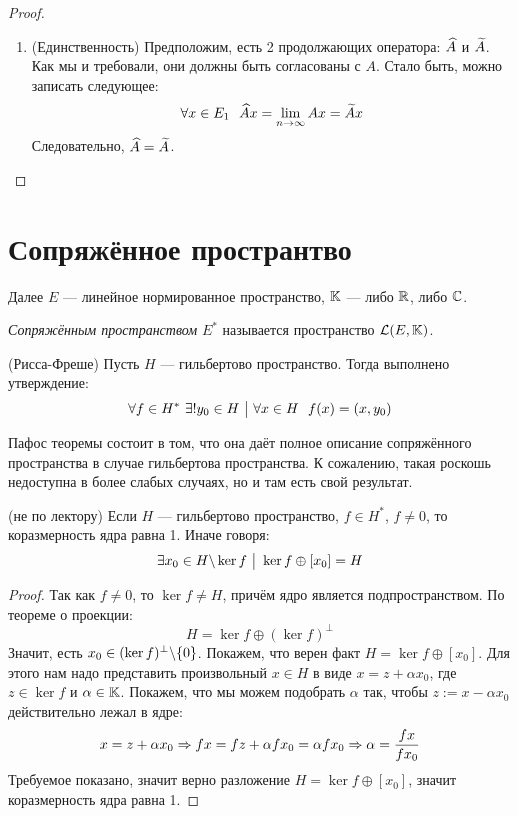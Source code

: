 \begin{proof}
\begin{enumerate}
		\item (Единственность) Предположим, есть 2 продолжающих оператора: $\widehat{A}$ и $\widetilde{A}$. Как мы и требовали, они должны быть согласованы с $A$. Стало быть, можно записать следующее:
		\[
			\forall x \in E_1\ \ \widehat{A}x = \lim_{n \to \infty} Ax = \widetilde{A}x
		\]
		Следовательно, $\widehat{A} = \widetilde{A}$.
	\end{enumerate}
\end{proof}

\section{Сопряжённое пространтво}

\begin{note}
	Далее $E$ --- линейное нормированное пространство, $\mathbb{K}$ --- либо $\mathbb{R}$, либо $\mathbb{C}$.
\end{note}

\begin{definition}
	\textit{Сопряжённым пространством} $E^*$ называется пространство $\mathcal{L}(E, \mathbb{K})$.
\end{definition}

\begin{theorem} (Рисса-Фреше)
	Пусть $H$ --- гильбертово пространство. Тогда выполнено утверждение:
	\[
		\forall f \in H^*\ \exists! y_0 \in H \ \big|\  \forall x \in H\ \ f(x) = (x, y_0)
	\]
\end{theorem}

\begin{note}
	Пафос теоремы состоит в том, что она даёт полное описание сопряжённого пространства в случае гильбертова пространства. К сожалению, такая роскошь недоступна в более слабых случаях, но и там есть свой результат.
\end{note}

\begin{lemma} (не по лектору)
	Если $H$ --- гильбертово пространство, $f \in H^*$, $f \neq 0$, то коразмерность ядра равна 1. Иначе говоря:
	\[
		\exists x_0 \in H \backslash \ker f \ \big|\  \ker f \oplus [x_0] = H
	\]
\end{lemma}

\begin{proof}
	Так как $f \neq 0$, то $\ker f \neq H$, причём ядро является подпространством. По теореме о проекции:
	\[
		H = \ker f \oplus (\ker f)^\bot
	\]
	Значит, есть $x_0 \in (\ker f)^\bot \backslash \{0\}$. Покажем, что верен факт $H = \ker f \oplus [x_0]$. Для этого нам надо представить произвольный $x \in H$ в виде $x = z + \alpha x_0$, где $z \in \ker f$ и $\alpha \in \mathbb{K}$. Покажем, что мы можем подобрать $\alpha$ так, чтобы $z := x - \alpha x_0$ действительно лежал в ядре:
	\[
		x = z + \alpha x_0 \Rightarrow fx = fz + \alpha fx_0 = \alpha fx_0 \Rightarrow \alpha = \frac{fx}{fx_0}
	\]
	Требуемое показано, значит верно разложение $H = \ker f \oplus [x_0]$, значит коразмерность ядра равна 1.
\end{proof}

